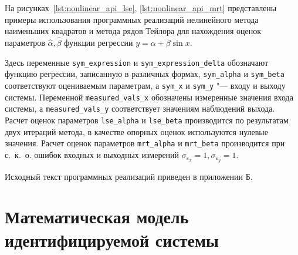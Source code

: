 На рисунках~\ref{lst:nonlinear_api_lse}, \ref{lst:nonlinear_api_mrt}
представлены примеры использования программных реализаций
нелинейного метода наименьших квадратов и метода рядов Тейлора для
нахождения оценок параметров \( \hat{\alpha}, \hat{\beta} \)
функции регрессии \( y = \alpha + \beta \sin{x} \).

\pagebreak


\vfill


Здесь переменные \texttt{sym\_expression} и \texttt{sym\_expression\_delta}
обозначают функцию регрессии, записанную в различных формах,
\texttt{sym\_alpha} и \texttt{sym\_beta} соответствуют оцениваемым параметрам,
а \texttt{sym\_x} и \texttt{sym\_y} "--- входу и выходу системы.
Переменной \texttt{measured\_vals\_x} обозначены измеренные значения входа системы,
а \texttt{measured\_vals\_y} соответствует значениям наблюдений выхода.
Расчет оценок параметров \texttt{lse\_alpha} и \texttt{lse\_beta} производится по
результатам двух итераций метода, в качестве опорных оценок используются нулевые значения.
Расчет оценок параметров \texttt{mrt\_alpha} и \texttt{mrt\_beta} производится
при с.~к.~о. ошибок входных и выходных измерений
\( \sigma_{\varepsilon_x } = 1, \sigma_{\varepsilon_y } = 1 \).

Исходный текст программных реализаций приведен в приложении Б.

\section{Математическая модель идентифицируемой системы}

